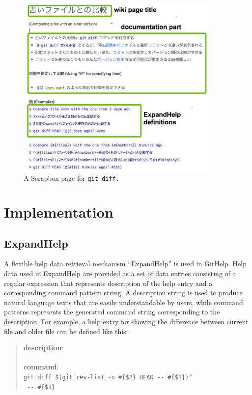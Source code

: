 \documentclass{sigchi}
\def\GH{\textsf{GitHelp}}
\def\SB{\textsf{Scrapbox}}
\def\EH{\textsf{ExpandHelp}}
\begin{document}
\begin{figure}[t]
  \centerline{\includegraphics[width=100mm,bb=-50 -50 1100 950]{figures/scrapbox2.png}}
  \caption{A {\SB} page for \tt{git diff}.}
  \label{scrapboxpage}
\end{figure}

\section{Implementation}

\subsection{ExpandHelp}

A flexible help data retrieval mechanism ``{\EH}'' is used in {\GH}.
%
Help data used in {\EH} are provided as a set of data entries
consisting of a regular expression that represents description of the help entry
and a corresponding command pattern string.
A description string is used to produce natural language texts
that are easily understandable by users,
while command patterns represents the generated command string
corresponding to the description.
%
For example, a help entry for showing the difference between
current file and older file can be defined like this:

\begin{quote}
  \textbf{description}: \\
  \\
  \textbf{command}: \\
  {\smallfont\verb|git diff $(git rev-list -n #{$2} HEAD -- #{$1})^|} \\
  {\smallfont\verb| -- #{$1}|}
\end{quote}
\end{document}
